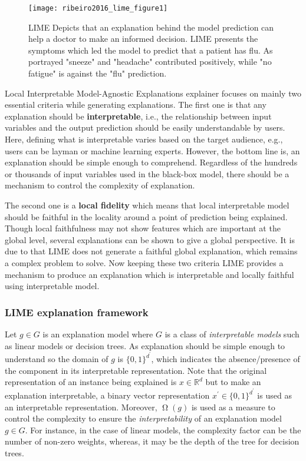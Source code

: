 \documentclass[english]{tktltiki2}
\theoremstyle{definition}
\theoremstyle{remark}
\begin{document}
\begin{figure}[H]
	\texttt{[image: ribeiro2016\_lime\_figure1]}
	\vspace*{-10mm}
	\caption{LIME \citep{ribeiro2016should} Depicts that an explanation behind the model prediction can help a doctor to make an informed decision. LIME presents the symptoms which led the model to predict that a patient has flu. As portrayed "sneeze" and "headache" contributed positively, while "no fatigue" is against the "flu" prediction. }
	\label{fig:ribeiro2016_lime_figure1}
\end{figure}
 
Local Interpretable Model-Agnostic Explanations \citep{ribeiro2016should} explainer focuses on mainly two essential criteria while generating explanations. The first one is that any explanation should be \textbf{interpretable}, i.e., the relationship between input variables and the output prediction should be easily understandable by users. Here, defining what is interpretable varies based on the target audience, e.g., users can be layman or machine learning experts. However, the bottom line is, an explanation should be simple enough to comprehend. Regardless of the hundreds or thousands of input variables used in the black-box model, there should be a mechanism to control the complexity of explanation.

The second one is a \textbf{local fidelity} which means that local interpretable model should be faithful in the locality around a point of prediction being explained. Though local faithfulness may not show features which are important at the global level, several explanations can be shown to give a global perspective. It is due to that LIME does not generate a faithful global explanation, which remains a complex problem to solve. Now keeping these two criteria LIME \citep{ribeiro2016should} provides a mechanism to produce an explanation which is interpretable and locally faithful using interpretable model.

\subsubsection{LIME explanation framework} %
Let $g \in G$ is an explanation model where $G$ is a class of \textit{interpretable models} such as linear models or decision trees. As explanation should be simple enough to understand so the domain of  $g$ is $\{0, 1\}^{d^\prime}$, which indicates the absence/presence of the component in its interpretable representation. Note that the original representation of an instance being explained is $x \in \mathbb{R}^d$ but to make an explanation interpretable, a binary vector representation $x^\prime \in \{0, 1\}^{d^\prime}$ is used as an interpretable representation. Moreover, $\upOmega(g)$ is used as a measure to control the complexity to ensure the \textit{interpretability} of an explanation model $g \in G$. For instance, in the case of linear models, the complexity factor can be the number of non-zero weights, whereas, it may be the depth of the tree for decision trees.
\end{document}
